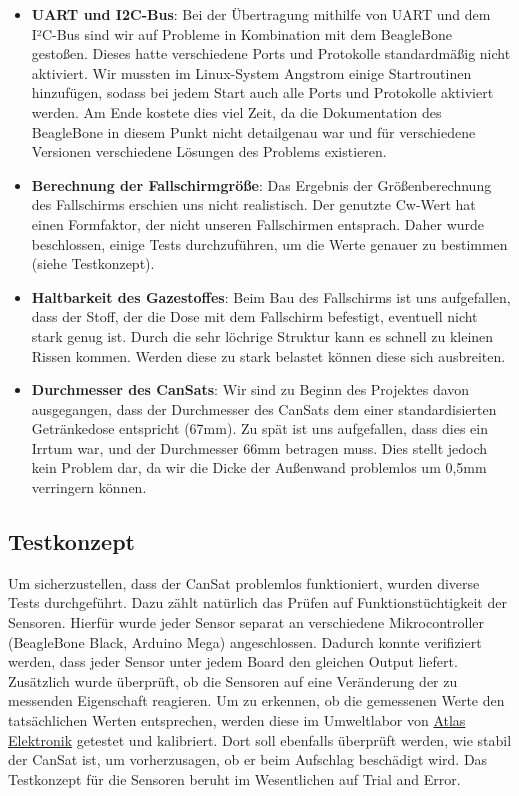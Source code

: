 \begin{itemize}
	\item \textbf{UART und I2C-Bus}: Bei der Übertragung mithilfe von UART und dem I²C-Bus sind wir auf Probleme in Kombination mit dem BeagleBone gestoßen. Dieses hatte verschiedene Ports und Protokolle standardmäßig nicht aktiviert. Wir mussten im Linux-System Angstrom einige Startroutinen hinzufügen, sodass bei jedem Start auch alle Ports und Protokolle aktiviert werden. Am Ende kostete dies viel Zeit, da die Dokumentation des BeagleBone in diesem Punkt nicht detailgenau war und für verschiedene Versionen verschiedene Lösungen des Problems existieren.
\item \textbf{Berechnung der Fallschirmgröße}: Das Ergebnis der Größenberechnung des Fallschirms erschien uns nicht realistisch. Der genutzte Cw-Wert hat einen Formfaktor, der nicht unseren Fallschirmen entsprach. Daher wurde beschlossen, einige Tests durchzuführen, um die Werte genauer zu bestimmen (siehe Testkonzept).
\item \textbf{Haltbarkeit des Gazestoffes}: Beim Bau des Fallschirms ist uns aufgefallen, dass der Stoff, der die Dose mit dem Fallschirm befestigt, eventuell nicht stark genug ist. Durch die sehr löchrige Struktur kann es schnell zu kleinen Rissen kommen. Werden diese zu stark belastet können diese sich ausbreiten.
\item \textbf{Durchmesser des CanSats}: Wir sind zu Beginn des Projektes davon ausgegangen, dass der Durchmesser des CanSats dem einer standardisierten Getränkedose entspricht (67mm). Zu spät ist uns aufgefallen, dass dies ein Irrtum war, und der Durchmesser 66mm betragen muss. Dies stellt jedoch kein Problem dar, da wir die Dicke der Außenwand problemlos um 0,5mm verringern können.
\end{itemize}

\subsection{Testkonzept}
Um sicherzustellen, dass der CanSat problemlos funktioniert, wurden diverse Tests durchgeführt. Dazu zählt natürlich das Prüfen auf Funktionstüchtigkeit der Sensoren. Hierfür wurde jeder Sensor separat an verschiedene Mikrocontroller (BeagleBone Black, Arduino Mega) angeschlossen. Dadurch konnte verifiziert werden, dass jeder Sensor unter jedem Board den gleichen Output liefert. Zusätzlich wurde überprüft, ob die Sensoren auf eine Veränderung der zu messenden Eigenschaft reagieren. Um zu erkennen, ob die gemessenen Werte den tatsächlichen Werten entsprechen, werden diese im Umweltlabor von \href{https://www.atlas-elektronik.com/atlas-elektronik/}{Atlas Elektronik} getestet und kalibriert. Dort soll ebenfalls überprüft werden, wie stabil der CanSat ist, um vorherzusagen, ob er beim Aufschlag beschädigt wird. Das Testkonzept für die Sensoren beruht im Wesentlichen auf Trial and Error.

